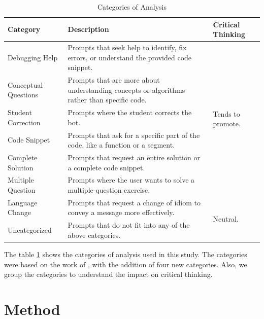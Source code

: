 \documentclass[conference]{IEEEtran}
\begin{document}
\begin{table}[htbp]
\caption{Categories of Analysis}
    \begin{center}
    \begin{tabular}{|p{3cm}|p{5cm}|p{3cm}|}
    \hline
    \textbf{Category} & \textbf{Description} & \textbf{Critical Thinking} \\
    \hline
    Debugging Help & Prompts that seek help to identify, fix errors, or understand the provided code snippet. & \multirow{6}{3cm}{Tends to promote.} \\
    Conceptual Questions & Prompts that are more about understanding concepts or algorithms rather than specific code. & \\
    Student Correction & Prompts where the student corrects the bot. & \\
    \hline
    Code Snippet & Prompts that ask for a specific part of the code, like a function or a segment. & \multirow{6}{3cm}{Tends not to promote.} \\
    Complete Solution & Prompts that request an entire solution or a complete code snippet. & \\
    Multiple Question & Prompts where the user wants to solve a multiple-question exercise. & \\
    \hline
    Language Change & Prompts that request a change of idiom to convey a message more effectively. & \multirow{3}{3cm}{Neutral.} \\
    Uncategorized & Prompts that do not fit into any of the above categories. & \\
    \hline
    \end{tabular}
    \label{tab:categories}
    \end{center}
\end{table}

The table \ref{tab:categories} shows the categories of analysis used in this
study. The categories were based on the work of
\cite{10.1007/978-3-031-64299-9_20}, with the addition of four new categories.
Also, we group the categories to understand the impact on critical thinking.


\section{Method}
\end{document}
